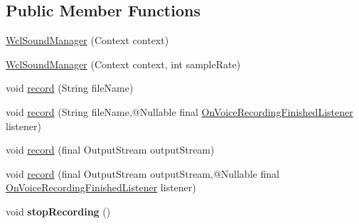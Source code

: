 \subsection*{Public Member Functions}
\begin{DoxyCompactItemize}
\item 
\hyperlink{classcom_1_1google_1_1devrel_1_1wcl_1_1widgets_1_1recording_1_1WclSoundManager_a13c39c7174f494dbb89e598f6074d0ce}{Wcl\+Sound\+Manager} (Context context)
\item 
\hyperlink{classcom_1_1google_1_1devrel_1_1wcl_1_1widgets_1_1recording_1_1WclSoundManager_a68edc7c6940098234ce962433bf9f792}{Wcl\+Sound\+Manager} (Context context, int sample\+Rate)
\item 
void \hyperlink{classcom_1_1google_1_1devrel_1_1wcl_1_1widgets_1_1recording_1_1WclSoundManager_aefe2ddd8a648e5c8433174adb606c26d}{record} (String file\+Name)
\item 
void \hyperlink{classcom_1_1google_1_1devrel_1_1wcl_1_1widgets_1_1recording_1_1WclSoundManager_a492d26a93fceaeff76e5b42db6364b6f}{record} (String file\+Name,@Nullable final \hyperlink{interfacecom_1_1google_1_1devrel_1_1wcl_1_1widgets_1_1recording_1_1WclSoundManager_1_1OnVoiceRecordingFinishedListener}{On\+Voice\+Recording\+Finished\+Listener} listener)
\item 
void \hyperlink{classcom_1_1google_1_1devrel_1_1wcl_1_1widgets_1_1recording_1_1WclSoundManager_ac135d723a93a3481eaa9d4d94a11c784}{record} (final Output\+Stream output\+Stream)
\item 
void \hyperlink{classcom_1_1google_1_1devrel_1_1wcl_1_1widgets_1_1recording_1_1WclSoundManager_ac1f3ca54655eff57c6f1d6d5c3f483ea}{record} (final Output\+Stream output\+Stream,@Nullable final \hyperlink{interfacecom_1_1google_1_1devrel_1_1wcl_1_1widgets_1_1recording_1_1WclSoundManager_1_1OnVoiceRecordingFinishedListener}{On\+Voice\+Recording\+Finished\+Listener} listener)
\item 
void {\bfseries stop\+Recording} ()\hypertarget{classcom_1_1google_1_1devrel_1_1wcl_1_1widgets_1_1recording_1_1WclSoundManager_a3163e551181ebc6a5eb805b0ebf4dc6f}{}\label{classcom_1_1google_1_1devrel_1_1wcl_1_1widgets_1_1recording_1_1WclSoundManager_a3163e551181ebc6a5eb805b0ebf4dc6f}


\end{DoxyCompactItemize}
